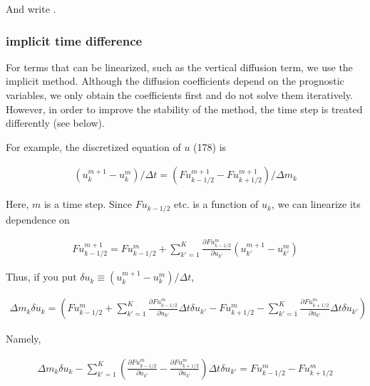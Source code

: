 And write .

\hypertarget{implicit-time-difference}{%
\subsubsection{implicit time difference}\label{implicit-time-difference}}

For terms that can be linearized, such as the vertical diffusion term, we use the implicit method. Although the diffusion coefficients depend on the prognostic variables, we only obtain the
coefficients first and do not solve them iteratively. However, in order to improve the stability of the method, the time step is treated differently (see below).

For example, the discretized equation of \(u\) (178) is

\begin{eqnarray}
  (u_k^{m+1} - u_k^{m})/\Delta t
    = (Fu^{m+1}_{k-1/2}-Fu^{m+1}_{k+1/2})/\Delta m_k
\end{eqnarray}

Here, \(m\) is a time step. Since \(Fu_{k-1/2}\) etc. is a function of \(u_k\), we can linearize its dependence on

\begin{eqnarray}
   Fu^{m+1}_{k-1/2}
  =  Fu^{m}_{k-1/2}
  +  \sum_{k'=1}^{K}
     \frac{\partial{Fu^{m}_{k-1/2}}}{\partial {u_{k'}}} (u^{m+1}_{k'}-u^{m}_{k'})
\end{eqnarray}

Thus, if you put \(\delta u_k \equiv (u^{m+1}_{k}-u^{m}_{k})/\Delta t\),

\begin{eqnarray}
  \Delta m_k \delta u_k
  =   \left( Fu^{m}_{k-1/2}
         +  \sum_{k'=1}^{K}
            \frac{\partial{Fu^{m}_{k-1/2}}}{\partial {u_{k'}}} \Delta t \delta u_{k'}
         -   Fu^{m}_{k+1/2}
         -  \sum_{k'=1}^{K}
            \frac{\partial{Fu^{m}_{k+1/2}}}{\partial {u_{k'}}} \Delta t \delta u_{k'}
      \right)
\end{eqnarray}

Namely,

\begin{eqnarray}
  \Delta m_k \delta u_k
  -  \sum_{k'=1}^{K} \left(  \frac{\partial{Fu^{m}_{k-1/2}}}{\partial {u_{k'}}}
                       - \frac{\partial{Fu^{m}_{k+1/2}}}{\partial {u_{k'}}} \right)
                 \Delta t\delta u_{k'}
  = Fu^{m}_{k-1/2} - Fu^{m}_{k+1/2}
\end{eqnarray}

